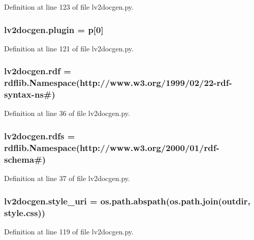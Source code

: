 Definition at line 123 of file lv2docgen.\+py.

\subsubsection[{\texorpdfstring{plugin}{plugin}}]{\setlength{\rightskip}{0pt plus 5cm}lv2docgen.\+plugin = {\bf p}\mbox{[}0\mbox{]}}\hypertarget{namespacelv2docgen_afc728ef34e814436971ab700cb7db3de}{}\label{namespacelv2docgen_afc728ef34e814436971ab700cb7db3de}


Definition at line 121 of file lv2docgen.\+py.

\subsubsection[{\texorpdfstring{rdf}{rdf}}]{\setlength{\rightskip}{0pt plus 5cm}lv2docgen.\+rdf = rdflib.\+Namespace(\textquotesingle{}http\+://www.\+w3.\+org/1999/02/22-\/rdf-\/{\bf syntax}-\/{\bf ns}\#\textquotesingle{})}\hypertarget{namespacelv2docgen_afca3a2919bd7c9bef9f07c7d7286122d}{}\label{namespacelv2docgen_afca3a2919bd7c9bef9f07c7d7286122d}


Definition at line 36 of file lv2docgen.\+py.

\subsubsection[{\texorpdfstring{rdfs}{rdfs}}]{\setlength{\rightskip}{0pt plus 5cm}lv2docgen.\+rdfs = rdflib.\+Namespace(\textquotesingle{}http\+://www.\+w3.\+org/2000/01/{\bf rdf}-\/schema\#\textquotesingle{})}\hypertarget{namespacelv2docgen_a2c4f1023b8c871bcdc6b47859ad0d9a1}{}\label{namespacelv2docgen_a2c4f1023b8c871bcdc6b47859ad0d9a1}


Definition at line 37 of file lv2docgen.\+py.

\subsubsection[{\texorpdfstring{style\+\_\+uri}{style_uri}}]{\setlength{\rightskip}{0pt plus 5cm}lv2docgen.\+style\+\_\+uri = os.\+path.\+abspath(os.\+path.\+join({\bf outdir}, \textquotesingle{}style.\+css\textquotesingle{}))}\hypertarget{namespacelv2docgen_aa8202cda5fd7a4be38bce51b21fed0c0}{}\label{namespacelv2docgen_aa8202cda5fd7a4be38bce51b21fed0c0}


Definition at line 119 of file lv2docgen.\+py.

